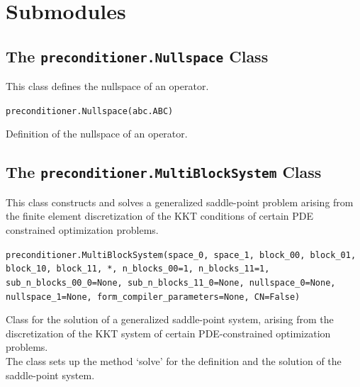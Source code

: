 \documentclass[letterpaper,10pt,english]{sphinxmanual}
\begin{document}
\section{Submodules}

\subsection{The \texttt{preconditioner.Nullspace} Class}
This class defines the nullspace of an operator.

\texttt{preconditioner.Nullspace(abc.ABC)}

Definition of the nullspace of an operator.


\subsection{The \texttt{preconditioner.MultiBlockSystem} Class}
This class constructs and solves a generalized saddle-point problem arising from the finite element discretization of the KKT conditions of certain PDE constrained optimization problems.

\texttt{preconditioner.MultiBlockSystem(space{\_}0, space{\_}1, block{\_}00, block{\_}01, block{\_}10, block{\_}11, *, n{\_}blocks{\_}00=1, n{\_}blocks{\_}11=1, sub{\_}n{\_}blocks{\_}00{\_}0=None, sub{\_}n{\_}blocks{\_}11{\_}0=None, nullspace{\_}0=None, nullspace{\_}1=None, form{\_}compiler{\_}parameters=None, CN=False)}

Class for the solution of a generalized saddle-point system, arising
    from the discretization of the KKT system of certain PDE-constrained
    optimization problems.\\
    The class sets up the method `solve' for the definition and the
    solution of the saddle-point system.
\end{document}
